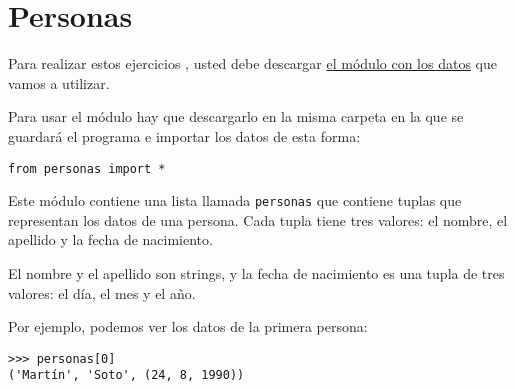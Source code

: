 \section{Personas}

Para realizar estos ejercicios , usted debe descargar
\href{../../\_static/personas.py}{el módulo con los datos} que vamos a
utilizar.

Para usar el módulo hay que descargarlo en la misma carpeta en la que se
guardará el programa e importar los datos de esta forma:

\begin{lstlisting}
from personas import *
\end{lstlisting}

Este módulo contiene una lista llamada \lstinline!personas! que contiene
tuplas que representan los datos de una persona. Cada tupla tiene tres
valores: el nombre, el apellido y la fecha de nacimiento.

El nombre y el apellido son strings, y la fecha de nacimiento es una
tupla de tres valores: el día, el mes y el año.

Por ejemplo, podemos ver los datos de la primera persona:

\begin{lstlisting}
>>> personas[0]
('Martín', 'Soto', (24, 8, 1990))
\end{lstlisting}

